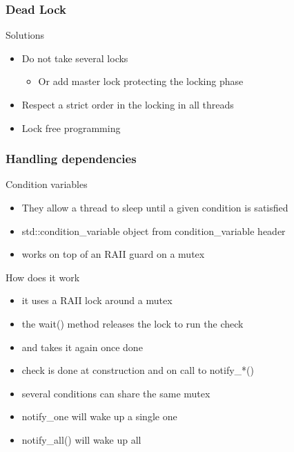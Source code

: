 \begin{frame}[fragile]
  \frametitle{Dead Lock}
  \begin{block}{Solutions}
    \begin{itemize}
    \item Do not take several locks
      \begin{itemize}
      \item Or add master lock protecting the locking phase
      \end{itemize}
    \item Respect a strict order in the locking in all threads
    \item Lock free programming
    \end{itemize}
  \end{block}
\end{frame}

\begin{frame}[fragile]
  \frametitle{Handling dependencies}
  \begin{block}{Condition variables}
    \begin{itemize}
    \item They allow a thread to sleep until a given condition is satisfied
    \item std::condition\_variable object from condition\_variable header
    \item works on top of an RAII guard on a mutex
    \end{itemize}
  \end{block}
  \pause
  \begin{block}{How does it work}
    \begin{itemize}
    \item it uses a RAII lock around a mutex
    \item the wait() method releases the lock to run the check
    \item and takes it again once done
    \item check is done at construction and on call to notify\_*()
    \item several conditions can share the same mutex
    \item notify\_one will wake up a single one
    \item notify\_all() will wake up all
    \end{itemize}
  \end{block}
\end{frame}

